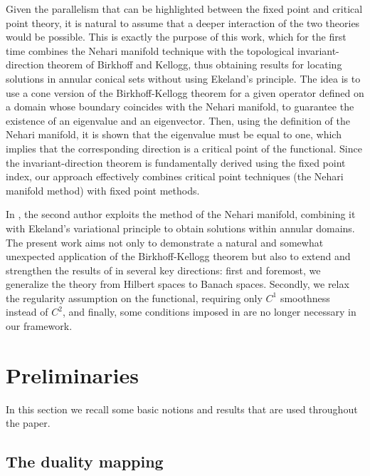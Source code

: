\documentclass{birkjour}
\theoremstyle{definition}
\theoremstyle{remark}
\numberwithin{equation}{section}
\begin{document}
Given the parallelism that can be highlighted between the fixed point and
critical point theory, it is natural to assume that a deeper interaction of
the two theories would be possible. This is exactly the purpose of this
work, which for the first time combines the Nehari manifold technique with
the topological invariant-direction theorem of Birkhoff and Kellogg, thus
obtaining results for locating solutions in annular conical sets without
using Ekeland's principle. The idea is to use a cone version of the
Birkhoff-Kellogg theorem for a given operator defined on a domain whose
boundary coincides with the Nehari manifold, to guarantee the existence of
an eigenvalue and an eigenvector. Then, using the definition of the Nehari
manifold, it is shown that the eigenvalue must be equal to one, which
implies that the corresponding direction is a critical point of the
functional. Since the invariant-direction theorem is fundamentally derived
using the fixed point index, our approach effectively combines critical
point techniques (the Nehari manifold method) with fixed point methods.

In \cite{as}, the second author exploits the method of the Nehari manifold,
combining it with Ekeland's variational principle to obtain solutions within
annular domains. The present work aims not only to demonstrate a natural and
somewhat unexpected application of the Birkhoff-Kellogg theorem but also to
extend and strengthen the results of \cite{as} in several key directions:
first and foremost, we generalize the theory from Hilbert spaces to Banach
spaces. Secondly, we relax the regularity assumption on the functional,
requiring only $C^{1}$ smoothness instead of $C^{2}$, and finally, some
conditions imposed in \cite{as} are no longer necessary in our framework.

\section{Preliminaries}

In this section we recall some basic notions and results that are used
throughout the paper.

\subsection{The duality mapping}
\end{document}
